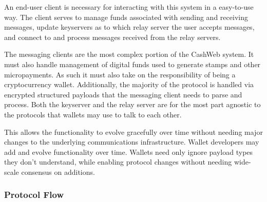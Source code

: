 \documentclass{article}
\begin{document}
An end-user client is necessary for interacting with this system in a easy-to-use way. The client serves to manage funds associated with sending and receiving messages, update keyservers as to which relay server the user accepts messages, and connect to and process messages received from the relay servers.

The messaging clients are the most complex portion of the CashWeb system. It must also handle management of digital funds used to generate stamps and other micropayments. As such it must also take on the responsibility of being a cryptocurrency wallet. Additionally, the majority of the protocol is handled via encrypted structured payloads that the messaging client needs to parse and process. Both the keyserver and the relay server are for the most part agnostic to the protocols that wallets may use to talk to each other.

This allows the functionality to evolve gracefully over time without needing major changes to the underlying communications infrastructure. Wallet developers may add and evolve functionality over time. Wallets need only ignore payload types they don't understand, while enabling protocol changes without needing wide-scale consensus on additions.

\subsubsection{Protocol Flow}

\begin{figure}[H]
  \begin{center}
  \end{center}
\end{figure}
\end{document}
